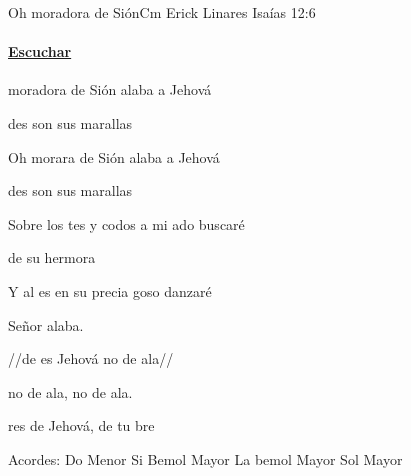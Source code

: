 \documentclass[12pt, spanish]{book}
\begin{document}
    \begin{song}{Oh moradora de Sión}{Cm}
    {} %
    {Erick Linares}
    {Isaías 12:6} %
    {}
        \ifChordBk
        \paragraph{\mbox{}\hfill\protect\href{https://open.spotify.com/intl-es/track/6hsJSp5akl93y4cqI7wPqg}{Escuchar}\mbox{}\hfill}
        \fi


        \begin{SBChorus}
             moradora de Sión alaba a Jehová

            des son sus marallas

            Oh morara de Sión alaba a Jehová

            des son sus marallas
        \end{SBChorus}

        \begin{SBOpGroup}
            Sobre los tes y codos a mi ado buscaré

            de  su hermora

            Y al es en su precia goso danzaré

             Señor alaba.
        \end{SBOpGroup}

        \begin{SBOpGroup}
            //de es Jehová    no de ala//

            no de ala,      no de ala.
        \end{SBOpGroup}

        \begin{SBOpGroup}
             res de Jehová,           de  tu bre
        \end{SBOpGroup}

        \ifChordBk
        \begin{SBOpGroup}
            Acordes:
            \upchord{\Cm}\qquad Do Menor \hfill
            \upchord{\Bflat}\qquad Si Bemol Mayor \hfill\null\break
            \upchord{\Aflat}\qquad La bemol Mayor \hfill
            \upchord{\G}\qquad Sol Mayor \hfill\null\break
        \end{SBOpGroup}
        \fi
    \end{song}
\end{document}
